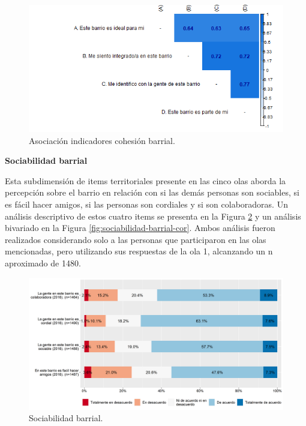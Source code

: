 \documentclass[
  12pt,
]{book}
\begin{document}
\begin{figure}[H]

{\centering \includegraphics[width=1\linewidth,height=1\textheight]{output/graphs/cohesion-barrial_cor} 

}

\caption{Asociación indicadores cohesión barrial.}\label{fig:cohesion-barrial-cor}
\end{figure}

\textbf{Sociabilidad barrial}

Esta subdimensión de items territoriales presente en las cinco olas aborda la percepción sobre el barrio en relación con si las demás personas son sociables, si es fácil hacer amigos, si las personas son cordiales y si son colaboradoras. Un análisis descriptivo de estos cuatro items se presenta en la Figura \ref{fig:sociabilidad-barrial} y un análisis bivariado en la Figura \ref{fig:sociabilidad-barrial-cor}. Ambos análisis fueron realizados considerando solo a las personas que participaron en las olas mencionadas, pero utilizando sus respuestas de la ola 1, alcanzando un n aproximado de 1480.

\begin{figure}[H]

{\centering \includegraphics[width=1\linewidth,height=1\textheight]{output/graphs/sociabilidad-barrial} 

}

\caption{Sociabilidad barrial.}\label{fig:sociabilidad-barrial}
\end{figure}
\end{document}
